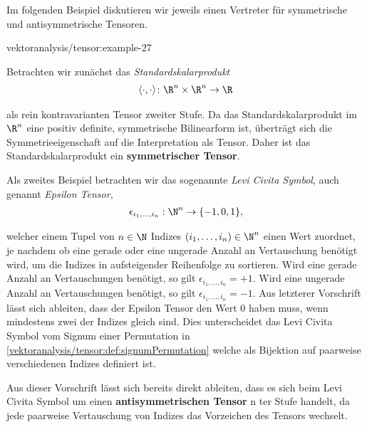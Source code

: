 \documentclass[letterpaper,10pt,english]{jupyterBook}
\begin{document}
\par
Im folgenden Beispiel diskutieren wir jeweils einen Vertreter für symmetrische und antisymmetrische Tensoren.
\begin{example}{}{vektoranalysis/tensor:example-27}



\par
Betrachten wir zunächst das \emph{Standardskalarprodukt}
\begin{align*}
\langle \cdot, \cdot \rangle \colon \R^n \times \R^n \rightarrow \R
\end{align*}
\par
als rein kontravarianten Tensor zweiter Stufe.
Da das Standardskalarprodukt im \(\R^n\) eine positiv definite, symmetrische Bilinearform ist, überträgt sich die Symmetrieeigenschaft auf die Interpretation als Tensor.
Daher ist das Standardskalarprodukt ein \textbf{symmetrischer Tensor}.



\par
Als zweites Beispiel betrachten wir das sogenannte \emph{Levi Civita Symbol}, auch genannt \emph{Epsilon Tensor},
\begin{align*}
\epsilon_{i_1,\ldots,i_n} : \N^n \rightarrow \lbrace -1, 0, 1 \rbrace,
\end{align*}
\par
welcher einem Tupel von \(n\in\N\) Indizes \((i_1,\ldots,i_n) \in \N^n\) einen Wert zuordnet, je nachdem ob eine gerade oder eine ungerade Anzahl an Vertauschung benötigt wird, um die Indizes in aufsteigender Reihenfolge zu sortieren.
Wird eine gerade Anzahl an Vertauschungen benötigt, so gilt \(\epsilon_{i_1,\ldots,i_n} = +1\).
Wird eine ungerade Anzahl an Vertauschungen benötigt, so gilt \(\epsilon_{i_1,\ldots,i_n} = -1\).
Aus letzterer Vorschrift lässt sich ableiten, dass der Epsilon Tensor den Wert \(0\) haben muss, wenn mindestens zwei der Indizes gleich sind.
Dies unterscheidet das Levi Civita Symbol vom Signum einer Permutation in \cref{vektoranalysis/tensor:def:signumPermutation}  welche als Bijektion auf paarweise verschiedenen Indizes definiert ist.

\par
Aus dieser Vorschrift lässt sich bereits direkt ableiten, dass es sich beim Levi Civita Symbol um einen \textbf{antisymmetrischen Tensor} n ter Stufe handelt, da jede paarweise Vertauschung von Indizes das Vorzeichen des Tensors wechselt.
\end{example}
\end{document}

